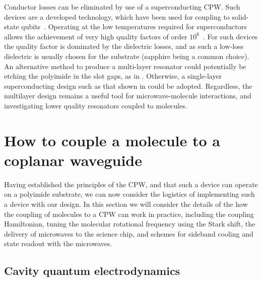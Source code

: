 Conductor losses can be eliminated by use of a superconducting CPW. Such
devices are a developed technology, which have been used for coupling to
solid-state qubits~\cite{Wallraff2004}. Operating at the low temperatures
required for superconductors allows the achievement of very high quality
factors of order $10^6$~\cite{doi:10.1063/1.3552890, Day2003}. For such devices
the quality factor is dominated by the dielectric losses, and as such a
low-loss dielectric is usually chosen for the substrate (sapphire being a
common choice). An alternative method to produce a multi-layer resonator could
potentially be etching the polyimide in the slot gaps, as in
. Otherwise, a single-layer superconducting design such as
that shown in  could be adopted. Regardless, the
multilayer design remains a useful tool for microwave-molecule interactions,
and investigating lower quality resonators coupled to molecules. 


\section{How to couple a molecule to a coplanar waveguide}
\label{mws:integrating}

Having established the principles of the CPW, and that such a device can
operate on a polyimide substrate, we can now consider the logistics of
implementing such a device with our design. In this section we will consider
the details of the how the coupling of molecules to a CPW can work in practice,
including the coupling Hamiltonian, tuning the molecular rotational frequency
using the Stark shift,  the delivery of microwaves to the science chip, and
schemes for sideband cooling and state readout with the microwaves.

\subsection{Cavity quantum electrodynamics}

